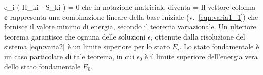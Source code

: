 \beq
{}c_i \left( H_{ki} - \epsilon S_{ki} \right) = 0
\eeq
che in notazione matriciale diventa
\beq
\label{eqn:varia2}
 = \epsilon {} 
\eeq
Il vettore colonna $\mathbf{c}$ rappresenta una combinazione lineare della base iniziale
(v.~\ref{eqn:varia1_1}) che fornisce il valore minimo di energia, secondo il
teorema variazionale. Un ulteriore teorema garantisce che ognuna delle
soluzioni $\epsilon_i$ ottenute dalla risoluzione
del sistema \ref{eqn:varia2} \`e un limite superiore per lo stato $E_i$. Lo stato
fondamentale \`e un caso particolare di tale teorema, in cui $\epsilon_0$
\`e il limite superiore dell'energia vera dello stato fondamentale $E_0$.

